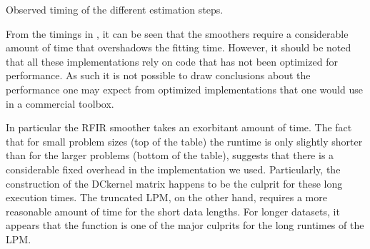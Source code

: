 \begin{table}
  \centering
  \centering
  \caption{Observed timing of the different estimation steps.}
% 
\label{tbl:init:timing}
\end{table}

From the timings in , it can be seen that the smoothers require a considerable amount of time that overshadows the fitting time.
However, it should be noted that all these implementations rely on code that has not been optimized for performance.
As such it is not possible to draw conclusions about the performance one may expect from optimized implementations that one would use in a commercial toolbox.

In particular the \gls{RFIR} smoother takes an exorbitant amount of time.
The fact that for small problem sizes (top of the table) the runtime is only slightly shorter than for the larger problems (bottom of the table), suggests that there is a considerable fixed overhead in the implementation we used.
Particularly, the construction of the \gls{DCkernel} matrix happens to be the culprit for these long execution times.
The truncated \gls{LPM}, on the other hand, requires a more reasonable amount of time for the short data lengths.
For longer datasets, it appears that the  function is one of the major culprits for the long runtimes of the \gls{LPM}.

